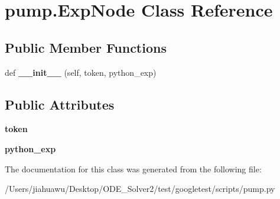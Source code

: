 \hypertarget{classpump_1_1_exp_node}{}\section{pump.\+Exp\+Node Class Reference}
\label{classpump_1_1_exp_node}
\subsection*{Public Member Functions}
\begin{DoxyCompactItemize}
\item 
\mbox{\label{classpump_1_1_exp_node_a0808c394c4d3c8ac875005caa1b3e1b3}} 
def {\bfseries \+\_\+\+\_\+init\+\_\+\+\_\+} (self, token, python\+\_\+exp)
\end{DoxyCompactItemize}
\subsection*{Public Attributes}
\begin{DoxyCompactItemize}
\item 
\mbox{\label{classpump_1_1_exp_node_ade05a5a32535d717dc5c194569aaf356}} 
{\bfseries token}
\item 
\mbox{\label{classpump_1_1_exp_node_adccfe4778c2e34f6b2c88118c0f1587f}} 
{\bfseries python\+\_\+exp}
\end{DoxyCompactItemize}


The documentation for this class was generated from the following file\+:\begin{DoxyCompactItemize}
\item 
/\+Users/jiahuawu/\+Desktop/\+O\+D\+E\+\_\+\+Solver2/test/googletest/scripts/pump.\+py\end{DoxyCompactItemize}
